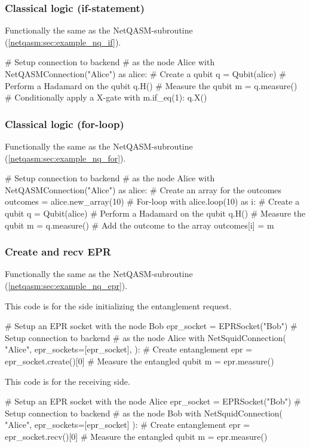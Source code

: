 \subsubsection{Classical logic (if-statement)}
Functionally the same as the \ac{NetQASM}-subroutine (\cref{netqasm:sec:example_nq_if}).
\begin{pycode}
# Setup connection to backend
# as the node Alice
with NetQASMConnection("Alice") as alice:
  # Create a qubit
  q = Qubit(alice)
  # Perform a Hadamard on the qubit
  q.H()
  # Measure the qubit
  m = q.measure()
  # Conditionally apply a X-gate
  with m.if_eq(1):
    q.X()
\end{pycode}

\subsubsection{Classical logic (for-loop)}
Functionally the same as the \ac{NetQASM}-subroutine (\cref{netqasm:sec:example_nq_for}).
\begin{pycode}
# Setup connection to backend
# as the node Alice
with NetQASMConnection("Alice") as alice:
  # Create an array for the outcomes
  outcomes = alice.new_array(10)
  # For-loop
  with alice.loop(10) as i:
    # Create a qubit
    q = Qubit(alice)
    # Perform a Hadamard on the qubit
    q.H()
    # Measure the qubit
    m = q.measure()
    # Add the outcome to the array
    outcomes[i] = m
\end{pycode}

\subsubsection{Create and recv EPR}
Functionally the same as the \ac{NetQASM}-subroutine (\cref{netqasm:sec:example_nq_epr}).

This code is for the side initializing the entanglement request.
\begin{pycode}
# Setup an EPR socket with the node Bob
epr_socket = EPRSocket("Bob")
# Setup connection to backend
# as the node Alice
with NetSquidConnection(
"Alice",
epr_sockets=[epr_socket],
):
  # Create entanglement
  epr = epr_socket.create()[0]
  # Measure the entangled qubit
  m = epr.measure()
\end{pycode}

This code is for the receiving side.
\begin{pycode}
# Setup an EPR socket with the node Alice
epr_socket = EPRSocket("Bob")
# Setup connection to backend
# as the node Bob
with NetSquidConnection(
"Alice",
epr_sockets=[epr_socket]
):
  # Create entanglement
  epr = epr_socket.recv()[0]
  # Measure the entangled qubit
  m = epr.measure()
\end{pycode}



\begin{xstretch}
\printbibliography[heading=subbibintoc,title={References},notcategory=noprint]
\end{xstretch}